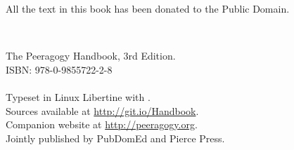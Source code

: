 \documentclass[ebook, 12pt, twoside]{memoir}
\newcommand\blankpage{%
    \null
    \thispagestyle{empty}%
    \addtocounter{page}{-1}%
    \newpage}
\begin{document}
\begin{center}
{\large All the text in this book has been donated to the Public Domain.}
\end{center}
\quad \\[3.5in] 
\begin{center}
\large{The Peeragogy Handbook, 3rd Edition.\\
ISBN: 978-0-9855722-2-8}
\quad \\[.2in] 
\quad \\[.2in]
\large{Typeset in Linux Libertine with \XeLaTeX. \\
Sources available at \url{http://git.io/Handbook}.\\
Companion website at \url{http://peeragogy.org}.}
\quad \\[.2in]
\large{Jointly published by PubDomEd and Pierce Press.}
\end{center}
\thispagestyle{empty}
\clearpage



\frontmatter

\pagestyle{empty}
\thispagestyle{empty}
\setcounter{page}{-1}
{
\changepage{10mm}{}{}{}{}{-10mm}{}{}{}{}{}{}{}{}
%
\renewcommand{\baselinestretch}{1.2}\normalsize
\tableofcontents*
\renewcommand{\baselinestretch}{1.0}\normalsize
}

\end{document}

